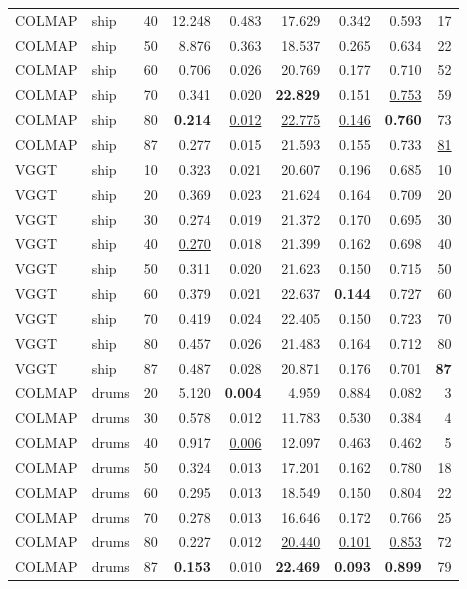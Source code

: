 \begin{table}[H]
\begin{tabular}{llrrrrrrr}
COLMAP & ship & 40 & 12.248 & 0.483 & 17.629 & 0.342 & 0.593 & 17 \\
COLMAP & ship & 50 & 8.876 & 0.363 & 18.537 & 0.265 & 0.634 & 22 \\
COLMAP & ship & 60 & 0.706 & 0.026 & 20.769 & 0.177 & 0.710 & 52 \\
COLMAP & ship & 70 & 0.341 & 0.020 & \textbf{22.829} & 0.151 & \underline{0.753} & 59 \\
COLMAP & ship & 80 & \textbf{0.214} & \underline{0.012} & \underline{22.775} & \underline{0.146} & \textbf{0.760} & 73 \\
COLMAP & ship & 87 & 0.277 & 0.015 & 21.593 & 0.155 & 0.733 & \underline{81} \\
VGGT & ship & 10 & 0.323 & 0.021 & 20.607 & 0.196 & 0.685 & 10 \\
VGGT & ship & 20 & 0.369 & 0.023 & 21.624 & 0.164 & 0.709 & 20 \\
VGGT & ship & 30 & 0.274 & 0.019 & 21.372 & 0.170 & 0.695 & 30 \\
VGGT & ship & 40 & \underline{0.270} & 0.018 & 21.399 & 0.162 & 0.698 & 40 \\
VGGT & ship & 50 & 0.311 & 0.020 & 21.623 & 0.150 & 0.715 & 50 \\
VGGT & ship & 60 & 0.379 & 0.021 & 22.637 & \textbf{0.144} & 0.727 & 60 \\
VGGT & ship & 70 & 0.419 & 0.024 & 22.405 & 0.150 & 0.723 & 70 \\
VGGT & ship & 80 & 0.457 & 0.026 & 21.483 & 0.164 & 0.712 & 80 \\
VGGT & ship & 87 & 0.487 & 0.028 & 20.871 & 0.176 & 0.701 & \textbf{87} \\
\midrule
COLMAP & drums & 20 & 5.120 & \textbf{0.004} & 4.959 & 0.884 & 0.082 & 3 \\
COLMAP & drums & 30 & 0.578 & 0.012 & 11.783 & 0.530 & 0.384 & 4 \\
COLMAP & drums & 40 & 0.917 & \underline{0.006} & 12.097 & 0.463 & 0.462 & 5 \\
COLMAP & drums & 50 & 0.324 & 0.013 & 17.201 & 0.162 & 0.780 & 18 \\
COLMAP & drums & 60 & 0.295 & 0.013 & 18.549 & 0.150 & 0.804 & 22 \\
COLMAP & drums & 70 & 0.278 & 0.013 & 16.646 & 0.172 & 0.766 & 25 \\
COLMAP & drums & 80 & 0.227 & 0.012 & \underline{20.440} & \underline{0.101} & \underline{0.853} & 72 \\
COLMAP & drums & 87 & \textbf{0.153} & 0.010 & \textbf{22.469} & \textbf{0.093} & \textbf{0.899} & 79 \\

\end{tabular}
\end{table}

